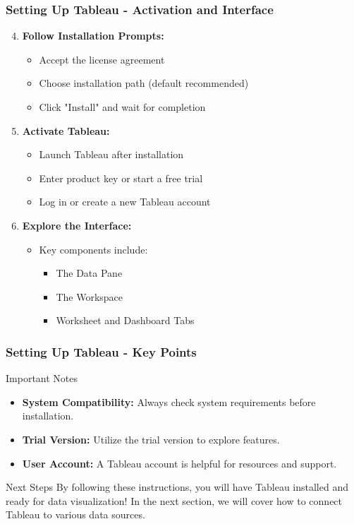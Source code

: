 \documentclass[aspectratio=169]{beamer}
\begin{document}
\begin{frame}[fragile]
    \frametitle{Setting Up Tableau - Activation and Interface}
    \begin{enumerate}
        \setcounter{enumi}{3}
        \item \textbf{Follow Installation Prompts:}
        \begin{itemize}
            \item Accept the license agreement
            \item Choose installation path (default recommended)
            \item Click "Install" and wait for completion
        \end{itemize}

        \item \textbf{Activate Tableau:}
        \begin{itemize}
            \item Launch Tableau after installation
            \item Enter product key or start a free trial
            \item Log in or create a new Tableau account
        \end{itemize}

        \item \textbf{Explore the Interface:}
        \begin{itemize}
            \item Key components include:
            \begin{itemize}
                \item The Data Pane
                \item The Workspace
                \item Worksheet and Dashboard Tabs
            \end{itemize}
        \end{itemize}
    \end{enumerate}
\end{frame}

\begin{frame}[fragile]
    \frametitle{Setting Up Tableau - Key Points}
    \begin{block}{Important Notes}
        \begin{itemize}
            \item \textbf{System Compatibility:} Always check system requirements before installation.
            \item \textbf{Trial Version:} Utilize the trial version to explore features.
            \item \textbf{User Account:} A Tableau account is helpful for resources and support.
        \end{itemize}
    \end{block}
    
    \begin{block}{Next Steps}
        By following these instructions, you will have Tableau installed and ready for data visualization! In the next section, we will cover how to connect Tableau to various data sources.
    \end{block}
\end{frame}
\end{document}
